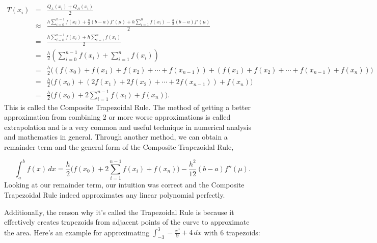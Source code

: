 \documentclass[12pt]{article}
\newcommand{\newLine}{\vspace{5mm}}
\newcommand{\integral}[3]{\text{$\int^{#2}_{#1} #3\,dx$}}
\newcommand{\summation}[3]{\text{$\sum^{#2}_{#1} #3$}}
\begin{document}
\begin{eqnarray*} T(x_i) &=& \frac{Q_L(x_i) + Q_R(x_i)}{2} \\
&\approx& \frac{h\summation{i = 0}{n - 1}{f(x_i)} + \frac{h}{2}(b-a)f'(\mu) + h\summation{i = 1}{n}{f(x_i)} - \frac{h}{2}(b-a)f'(\mu)}{2} \\
&=& \frac{h\summation{i = 0}{n - 1}{f(x_i)} + h\summation{i = 1}{n}{f(x_i)}}{2} \\
&=& \frac{h}{2}\left(\summation{i = 0}{n - 1}{f(x_i)} + \summation{i = 1}{n}{f(x_i)}\right) \\
&=& \frac{h}{2}\Big((f(x_0) + f(x_1) + f(x_2) + \cdots + f(x_{n-1})) + (f(x_1) + f(x_2) + \cdots + f(x_{n-1}) + f(x_n))\Big) \\
&=& \frac{h}{2}\Big(f(x_0) + (2f(x_1) + 2f(x_2) + \cdots + 2f(x_{n-1})) + f(x_n)\Big) \\
&=& \frac{h}{2}\Big(f(x_0) + 2\summation{i=1}{n-1}f(x_i) + f(x_n)\Big).
\end{eqnarray*}
This is called the Composite Trapezoidal Rule. The method of getting a better approximation from combining 2 or more worse approximations is called extrapolation and is a very common and useful technique in numerical analysis and mathematics in general. Through another method, we can obtain a remainder term and the general form of the Composite Trapezoidal Rule,

\begin{equation*} 
\integral{a}{b}{f(x)} = \frac{h}{2}\Big(f(x_0) + 2\summation{i = 1}{n-1}{f(x_i)} + f(x_n)\Big) - \frac{h^2}{12}(b-a)f''(\mu).
\end{equation*}
Looking at our remainder term, our intuition was correct and the Composite Trapezoidal Rule indeed approximates any linear polynomial perfectly.

\newLine Additionally, the reason why it's called the Trapezoidal Rule is because it effectively creates trapezoids from adjacent points of the curve to approximate the area. Here's an example for approximating $\integral{-3}{3}{-\frac{x^3}{9}+4}$ with 6 trapezoids:
\end{document}
